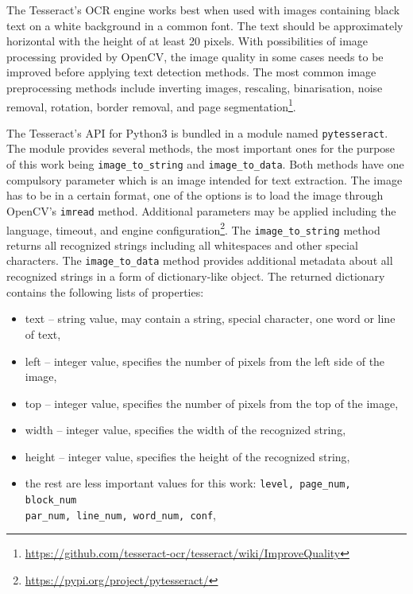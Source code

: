 The Tesseract's OCR engine works best when used with images containing black text on a white background in a common font. The text should be approximately horizontal with the height of at least 20 pixels. With possibilities of image processing provided by OpenCV, the image quality in some cases needs to be improved before applying text detection methods. The most common image preprocessing methods include inverting images, rescaling, binarisation, noise removal, rotation, border removal, and page segmentation\footnote{\url{https://github.com/tesseract-ocr/tesseract/wiki/ImproveQuality}}.

The Tesseract's API for Python3 is bundled in a module named \texttt{pytesseract}. The module provides several methods, the most important ones for the purpose of this work being \verb|image_to_string| and \verb|image_to_data|. Both methods have one compulsory parameter which is an image intended for text extraction. The image has to be in a certain format, one of the options is to load the image through OpenCV's \texttt{imread} method. Additional parameters may be applied including the language, timeout, and engine configuration\footnote{\url{https://pypi.org/project/pytesseract/}}. The \verb|image_to_string| method returns all recognized strings including all whitespaces and other special characters. The \verb|image_to_data| method provides additional metadata about all recognized strings in a form of dictionary-like object. The returned dictionary contains the following lists of properties:

\begin{itemize}
    \item text -- string value, may contain a string, special character, one word or line of text,
    \item left -- integer value, specifies the number of pixels from the left side of the image,
    \item top -- integer value, specifies the number of pixels from the top of the image,
    \item width -- integer value, specifies the width of the recognized string, 
    \item height -- integer value, specifies the height of the recognized string,
    \item the rest are less important values for this work: \verb|level, page_num, block_num| \\ \verb|par_num, line_num, word_num, conf|,
\end{itemize}

